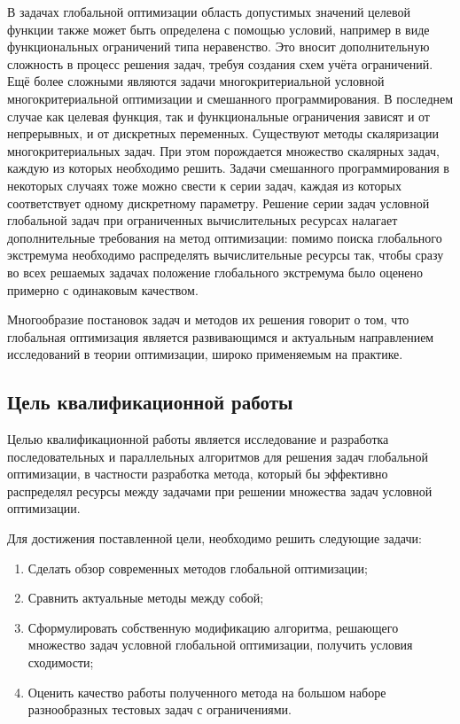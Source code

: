 В задачах глобальной оптимизации область допустимых значений целевой функции также может быть определена
с помощью условий, например в виде функциональных ограничений типа неравенство. Это вносит дополнительную сложность в процесс решения
задач, требуя создания схем учёта ограничений. Ещё более сложными являются задачи многокритериальной условной многокритериальной
оптимизации и смешанного программирования. В последнем случае как целевая функция, так и функциональные ограничения
зависят и от непрерывных, и от дискретных переменных. Существуют методы скаляризации многокритериальных задач.
При этом порождается множество скалярных задач, каждую из которых необходимо решить. Задачи смешанного программирования
в некоторых случаях тоже можно свести к серии задач, каждая из которых соответствует одному дискретному параметру.
Решение серии задач условной глобальной задач при ограниченных вычислительных
ресурсах налагает дополнительные требования на метод оптимизации: помимо поиска глобального экстремума необходимо
распределять вычислительные ресурсы так, чтобы сразу во всех решаемых задачах положение глобального
экстремума было оценено примерно с одинаковым качеством.

Многообразие постановок задач и методов их решения говорит о том, что глобальная оптимизация
является развивающимся и актуальным направлением исследований в теории оптимизации, широко применяемым на практике.

\subsection*{Цель квалификационной работы}

Целью квалификационной работы является исследование и разработка последовательных и параллельных алгоритмов для
решения задач глобальной оптимизации, в частности разработка метода, который бы эффективно распределял ресурсы между задачами при
решении множества задач условной оптимизации.

Для достижения поставленной цели, необходимо решить следующие задачи:
\begin{enumerate}
    \item Сделать обзор современных методов глобальной оптимизации;
    \item Сравнить актуальные методы между собой;
    \item Сформулировать собственную модификацию алгоритма, решающего множество задач условной глобальной оптимизации,
    получить условия сходимости;
    \item Оценить качество работы полученного метода на большом наборе разнообразных тестовых задач с ограничениями.
\end{enumerate}

